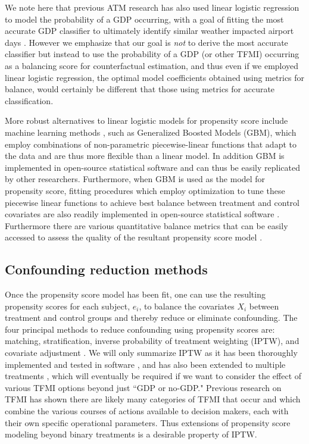 {We note here that previous ATM research has also used linear logistic regression to model the probability of a GDP occurring, with a goal of fitting the most accurate GDP classifier to ultimately identify similar weather impacted airport days \cite{Grabbe:2014aa}.  However we emphasize that our goal is \emph{not} to derive the most accurate classifier but instead to use the probability of a GDP (or other TFMI) occurring as a balancing score for counterfactual estimation, and thus even if we employed linear logistic regression, the optimal model coefficients obtained using metrics for balance, would certainly be different that those using metrics for accurate classification.

More robust alternatives to linear logistic models for propensity score include machine learning methods \cite{lee2010improving}, such as Generalized Boosted Models (GBM), which employ combinations of non-parametric piecewise-linear functions that adapt to the data and are thus more flexible than a linear model.  In addition GBM is implemented in open-source statistical software \cite{ridgeway2006gbm} and can thus be easily replicated by other researchers.  Furthermore, when GBM is used as the model for propensity score, fitting procedures which employ optimization to tune these piecewise linear functions to achieve best balance between treatment and control covariates are also readily implemented in open-source statistical software \cite{ridgeway2015toolkit}.  Furthermore there are various quantitative balance metrics that can be easily accessed to assess the quality of the resultant propensity score model \cite{ridgeway2015toolkit}. 

\subsection{Confounding reduction methods}
Once the propensity score model has been fit, one can use the resulting propensity scores for each subject, $e_i$, to balance the covariates $X_i$ between treatment and control groups and thereby reduce or eliminate confounding.  The four principal methods to reduce confounding using propensity scores are: matching, stratification, inverse probability of treatment weighting (IPTW), and covariate adjustment \cite{austin2011introduction}.  We will only summarize IPTW as it has been thoroughly implemented and tested in software \cite{ridgeway2015toolkit}, and has also been extended to multiple treatments \cite{mccaffrey2013tutorial}, which will eventually be required if we want to consider the effect of various TFMI options beyond just ``GDP or no-GDP."  Previous research on TFMI \cite{tfmireport} has shown there are likely many categories of TFMI that occur and which combine the various courses of actions available to decision makers, each with their own specific operational parameters. Thus extensions of propensity score modeling beyond binary treatments is a desirable property of IPTW.

}
